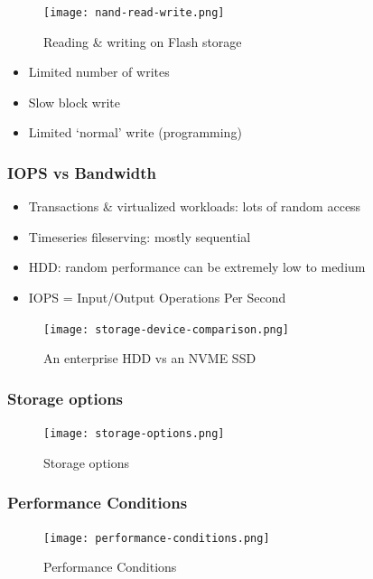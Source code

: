 \documentclass{article}
\begin{document}
\begin{figure}[H]
    \centering
    \texttt{[image: nand-read-write.png]}
    \caption{Reading \& writing on Flash storage}
\end{figure}

\begin{itemize}
    \item Limited number of writes
    \item Slow block write
    \item Limited `normal' write (programming)
\end{itemize}

\subsubsection{IOPS vs Bandwidth}

\begin{itemize}
    \item Transactions \& virtualized workloads: lots of random access
    \item Timeseries fileserving: mostly sequential
    \item HDD: random performance can be extremely low to medium 
    \item IOPS = Input/Output Operations Per Second
\end{itemize}

\begin{figure}[H]
    \centering
    \texttt{[image: storage-device-comparison.png]}
    \caption{An enterprise HDD vs an NVME SSD}
\end{figure}

\subsubsection{Storage options}

\begin{figure}[H]
    \centering
    \texttt{[image: storage-options.png]}
    \caption{Storage options}
\end{figure}

\subsubsection{Performance Conditions}

\begin{figure}[H]
    \centering
    \texttt{[image: performance-conditions.png]}
    \caption{Performance Conditions}
\end{figure}
\end{document}
